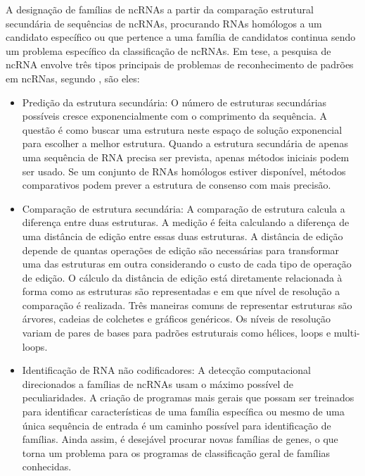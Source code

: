 A designação de famílias  de ncRNAs a partir da comparação estrutural secundária de sequências de ncRNAs, procurando RNAs homólogos a um candidato específico ou que pertence a uma família de candidatos continua sendo um problema específico da classificação de ncRNAs. Em tese, a pesquisa de ncRNA envolve três tipos principais de problemas de reconhecimento de padrões em ncRNas, segundo \cite{ncRNAs-content}, são eles:

\begin{itemize}
    \item Predição da estrutura secundária: O número de estruturas secundárias possíveis cresce exponencialmente com o comprimento da sequência. A questão é como buscar uma estrutura neste espaço de solução exponencial para escolher a melhor estrutura. Quando a estrutura secundária de apenas uma sequência de RNA precisa ser prevista, apenas métodos iniciais podem ser usado. Se um conjunto de RNAs homólogos estiver disponível, métodos comparativos podem prever a estrutura de consenso com mais precisão.
    
    \item Comparação de estrutura secundária: A comparação de estrutura calcula a diferença entre duas estruturas. A medição é feita calculando a diferença de uma distância de edição entre essas duas estruturas. A distância de edição depende de quantas operações de edição são necessárias para transformar uma das estruturas em outra considerando o custo de cada tipo de operação de edição. O cálculo da distância de edição está diretamente relacionada à forma como as estruturas são representadas e em que nível de resolução a comparação é realizada. Três maneiras comuns de representar estruturas são árvores, cadeias de colchetes e gráficos genéricos. Os níveis de resolução variam de pares de bases para padrões estruturais como hélices, loops e multi-loops.
    
    \item Identificação de RNA não codificadores: A detecção computacional direcionados a famílias de ncRNAs usam o máximo possível de peculiaridades. A criação de programas mais gerais que possam ser treinados para identificar características de uma família específica ou mesmo de uma única sequência de entrada é um caminho possível para identificação de famílias. Ainda assim, é desejável procurar novas famílias de genes, o que torna um problema para os programas de classificação geral de famílias conhecidas.
    
\end{itemize}

